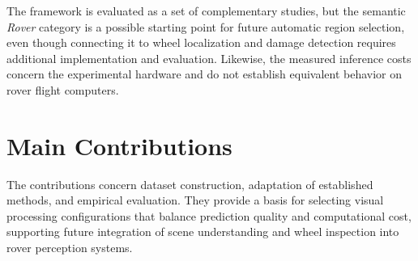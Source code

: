 
The framework is evaluated as a set of complementary studies, but the semantic \emph{Rover} category is a possible starting point for future automatic region selection, even though connecting it to wheel localization and damage detection requires additional implementation and evaluation. Likewise, the measured inference costs concern the experimental hardware and do not establish equivalent behavior on rover flight computers.

\section{Main Contributions}

The contributions concern dataset construction, adaptation of established methods, and empirical evaluation. They provide a basis for selecting visual processing configurations that balance prediction quality and computational cost, supporting future integration of scene understanding and wheel inspection into rover perception systems.

